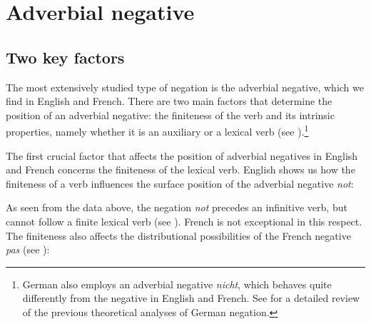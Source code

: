 \documentclass[output=paper
                ,modfonts
                ,nonflat
	        ,collection
	        ,collectionchapter
	        ,collectiontoclongg
 	        ,biblatex
                ,babelshorthands
                ,newtxmath
                ,draftmode
                ,colorlinks, citecolor=brown
]{./langsci/langscibook}
\begin{document}
{%
\section{Adverbial negative}

\subsection{Two key factors}


The most extensively studied type of negation is the adverbial negative, which
we find in English and French.
There are two main factors
that determine the position of an adverbial negative: the finiteness of
the verb and its intrinsic properties, namely whether it is an auxiliary
or a lexical  verb (see \citealt{Kim:00, KS:02}).\footnote{German also
employs an adverbial negative \textit{nicht}, which behaves quite
differently from the negative in English and French. See \citet{MuellerGT-Eng1}
for a detailed review of the previous theoretical analyses of German negation.}


The first crucial factor that affects  the position of adverbial
negatives in English and French concerns the finiteness of the lexical  verb.
English shows us how the finiteness of a verb influences the
surface position of the adverbial negative \textit{not}:

\begin{exe}
\ex\label{negation-eng-fin-neg} \begin{xlist}
\zl


\begin{exe}
\ex\label{negation-fr-fin-neg} \begin{xlist}
\zl
%
\noindent As seen from the data above, the negation \textit{not} precedes an infinitive verb, but cannot follow
a finite lexical  verb (see \citealt{Baker:89,Baker:91,Ernst:92}).
French is not exceptional in this respect. The finiteness also affects the distributional possibilities of the French negative {\it pas} (see \citealt{AG:97, KS:02, Zeijlstra:07}):

\eal
{}
\zl


\end{xlist}
\end{exe}
\end{xlist}
\end{exe}}
\end{document}
